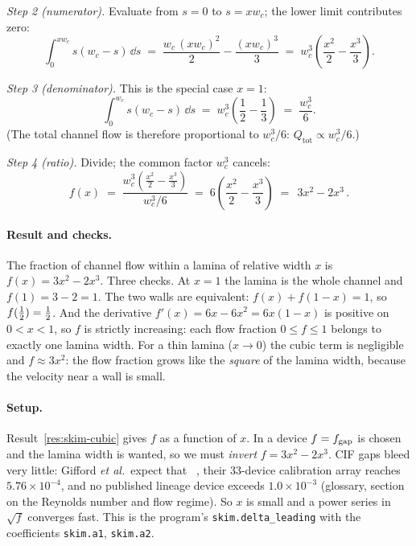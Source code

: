 \emph{Step 2 (numerator).} Evaluate from $s=0$ to $s=x w_c$; the lower limit contributes zero:
\begin{equation}
\int_0^{x w_c}\! s(w_c-s)\,\dd s \;=\; \frac{w_c\,(x w_c)^2}{2} - \frac{(x w_c)^3}{3}
\;=\; w_c^3\!\left(\frac{x^2}{2} - \frac{x^3}{3}\right).
\end{equation}

\emph{Step 3 (denominator).} This is the special case $x=1$:
\begin{equation}
\int_0^{w_c}\! s(w_c-s)\,\dd s \;=\; w_c^3\!\left(\frac{1}{2} - \frac{1}{3}\right) \;=\; \frac{w_c^3}{6}.
\end{equation}
(The total channel flow is therefore proportional to $w_c^3/6$: $Q_{\text{tot}}\propto w_c^3/6$.)

\emph{Step 4 (ratio).} Divide; the common factor $w_c^3$ cancels:
\begin{equation}
f(x) \;=\; \frac{w_c^3\!\left(\frac{x^2}{2}-\frac{x^3}{3}\right)}{w_c^3/6}
\;=\; 6\!\left(\frac{x^2}{2}-\frac{x^3}{3}\right)
\;=\; \boxed{\,3x^2 - 2x^3\,}.
\label{eq:r1}
\end{equation}

\paragraph{Result and checks.} The fraction of channel flow within a lamina of relative width
$x$ is $f(x)=3x^2-2x^3$. Three checks. At $x=1$ the lamina is the whole channel and
$f(1)=3-2=1$. The two walls are equivalent: $f(x)+f(1-x)=1$, so $f(\tfrac{1}{2})=\tfrac{1}{2}$. And the
derivative $f'(x)=6x-6x^2=6x(1-x)$ is positive on $0<x<1$, so $f$ is strictly increasing: each
flow fraction $0\le f\le1$ belongs to exactly one lamina width. For a thin lamina ($x\to0$) the
cubic term is negligible and $f\approx 3x^2$: the flow fraction grows like the \emph{square} of
the lamina width, because the velocity near a wall is small.

\label{res:skim-inversion}

\paragraph{Setup.} Result~\ref{res:skim-cubic} gives $f$ as a function of $x$. In a device
$f=f_{\mathrm{gap}}$ is chosen and the lamina width is wanted, so we must \emph{invert}
$f=3x^2-2x^3$. CIF gaps bleed very little: Gifford \emph{et al.}\ expect that
~\cite[p.~4498]{b1},
their 33-device calibration array reaches $5.76\times10^{-4}$, and no published lineage device
exceeds $1.0\times10^{-3}$ (glossary, section on the Reynolds number and flow regime). So $x$ is small and
a power series in $\sqrt{f}$ converges fast. This is the program's
\texttt{skim.delta\_leading} with the coefficients \texttt{skim.a1}, \texttt{skim.a2}.

